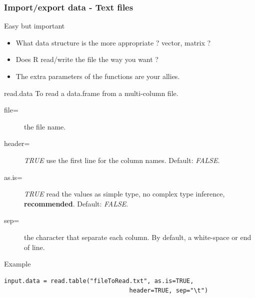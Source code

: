 \documentclass[10pt]{beamer}
\newenvironment{xframe}[2][]
  {\begin{frame}[fragile,environment=xframe,#1]
  \frametitle{#2}}
  {\end{frame}}
\begin{document}
\begin{xframe}[shrink=5]{Import/export data - Text files}
  \begin{block}{Easy but important}
    \begin{itemize}
    \item What data structure is the more appropriate ? {\sf vector}, {\sf matrix} ?
    \item Does R read/write the file the way you want ?
    \item The extra parameters of the functions are your allies.
    \end{itemize}
  \end{block}
  \begin{block}{{\sf read.data}}
    To read a {\sf data.frame} from a multi-column file.
    \begin{description}
    \item[file=] the file name.
    \item[header=] {\it TRUE} use the first line for the column names. Default: {\it FALSE}.
    \item[as.is=] {\it TRUE} read the values as simple type, no complex type inference, {\bf recommended}. Default: {\it FALSE}. 
    \item[sep=] the character that separate each column. By default, a white-space or end of line.
    \end{description}
  \end{block}
  \begin{exampleblock}{Example}
\begin{verbatim}
input.data = read.table("fileToRead.txt", as.is=TRUE,
                                   header=TRUE, sep="\t")
\end{verbatim}  
  \end{exampleblock}
\end{xframe}

\end{document}
